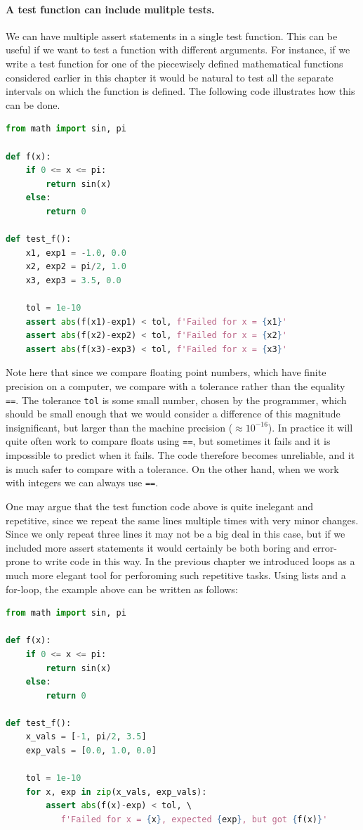 \documentclass[graybox,envcountchap,sectrefs,final]{svmonodo}
\begin{document}
\paragraph{A test function can include mulitple tests.}
We can have multiple assert statements in a single test function. This can be useful if we want to
test a function with different arguments.
For instance, if we write a test function for one of the piecewisely defined mathematical functions considered earlier
in this chapter it would be
natural to test all the separate intervals on which the function is defined. The following code illustrates how this can
be done.
\begin{lstlisting}[language=Python,style=blue1bar]
from math import sin, pi

def f(x):
    if 0 <= x <= pi:
        return sin(x)
    else:
        return 0

def test_f():
    x1, exp1 = -1.0, 0.0
    x2, exp2 = pi/2, 1.0
    x3, exp3 = 3.5, 0.0

    tol = 1e-10
    assert abs(f(x1)-exp1) < tol, f'Failed for x = {x1}'
    assert abs(f(x2)-exp2) < tol, f'Failed for x = {x2}'
    assert abs(f(x3)-exp3) < tol, f'Failed for x = {x3}'
\end{lstlisting}
Note here that since we compare floating point numbers, which have finite precision on a computer, we
compare with a tolerance rather than the equality \texttt{==}. The tolerance \texttt{tol} is some small number, chosen by the programmer,
which should be small enough that we would consider a difference of this magnitude insignificant, but larger
than the machine precision ($\approx 10^{-16}$). In practice it will quite often work to compare floats using \texttt{==}, but
sometimes it fails and it is impossible to predict when it fails. The code therefore becomes unreliable, and it is much safer
to compare with a tolerance. On the other hand, when we work with integers we can always use \texttt{==}.

One may argue that the test function code above is quite inelegant and repetitive, since we repeat the same lines multiple
times with very minor changes. Since we only repeat three lines it may not be a big deal in this case, but
if we included more assert statements it would certainly be both boring and error-prone to write code in this way.
In the previous chapter we introduced loops as a much more elegant tool for perforoming such
repetitive tasks. Using
lists and a for-loop, the example above can  be written as follows:
\begin{lstlisting}[language=Python,style=blue1bar]
from math import sin, pi

def f(x):
    if 0 <= x <= pi:
        return sin(x)
    else:
        return 0

def test_f():
    x_vals = [-1, pi/2, 3.5]
    exp_vals = [0.0, 1.0, 0.0]

    tol = 1e-10
    for x, exp in zip(x_vals, exp_vals):
    	assert abs(f(x)-exp) < tol, \ 
	       f'Failed for x = {x}, expected {exp}, but got {f(x)}'
\end{lstlisting}
\end{document}
